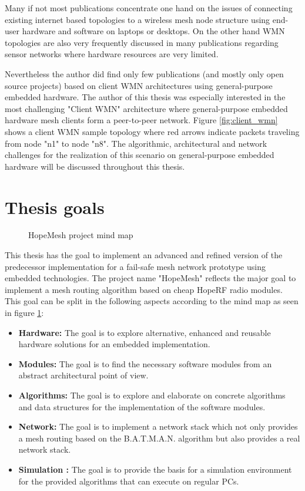 Many if not most publications concentrate one hand on the issues of connecting existing internet based topologies to a wireless mesh node structure using end-user hardware and software on laptops or desktops. On the other hand WMN topologies are also very frequently discussed in many publications regarding sensor networks where hardware resources are very limited.

Nevertheless the author did find only few publications (and mostly only open source projects) based on client WMN architectures using general-purpose embedded hardware. The author of this thesis was especially interested in the most challenging "Client WMN" architecture where general-purpose embedded hardware mesh clients form a peer-to-peer network. Figure \ref{fig:client_wmn} shows a client WMN sample topology where red arrows indicate packets traveling from node "n1" to node "n8". The algorithmic, architectural and network challenges for the realization of this scenario on general-purpose embedded hardware will be discussed throughout this thesis.

\section{Thesis goals}%
\begin{figure}[H]
\begin{tikzpicture}

\end{tikzpicture}
\caption{HopeMesh project mind map}
\label{fig:mindmap}
\end{figure}

This thesis has the goal to implement an advanced and refined version of the predecessor implementation \cite{korniowski} for a fail-safe mesh network prototype using embedded technologies. The project name "HopeMesh" reflects the major goal to implement a mesh routing algorithm based on cheap HopeRF radio modules. This goal can be split in the following aspects according to the mind map as seen in figure \ref{fig:mindmap}:
\begin{itemize}
    \item \textbf{Hardware: } The goal is to explore alternative, enhanced and reusable hardware solutions for an embedded implementation.
    \item \textbf{Modules:} The goal is to find the necessary software modules from an abstract architectural point of view.
    \item \textbf{Algorithms:} The goal is to explore and elaborate on concrete algorithms and data structures for the implementation of the software modules.
    \item \textbf{Network:} The goal is to implement a network stack which not only provides a mesh routing based on the B.A.T.M.A.N. algorithm but also provides a real network stack.
    \item \textbf{Simulation :} The goal is to provide the basis for a simulation environment for the provided algorithms that can execute on regular PCs.
\end{itemize}

